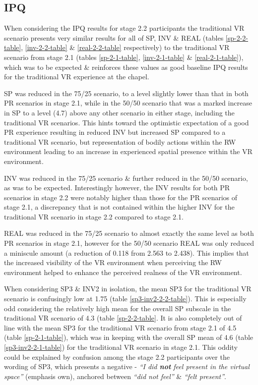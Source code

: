 
\subsection{IPQ}

When considering the IPQ results for stage 2.2 participants the traditional VR scenario presents very similar results for all of SP, INV \& REAL (tables \ref{sp-2-2-table}, \ref{inv-2-2-table} \& \ref{real-2-2-table} respectively) to the traditional VR scenario from stage 2.1 (tables \ref{sp-2-1-table}, \ref{inv-2-1-table} \& \ref{real-2-1-table}), which was to be expected \& reinforces these values as good baseline IPQ results for the traditional VR experience at the chapel.

SP was reduced in the 75/25 scenario, to a level slightly lower than that in both PR scenarios in stage 2.1, while in the 50/50 scenario that was a marked increase in SP to a level (4.7) above any other scenario in either stage, including the traditional VR scenarios. This hints toward the optimistic expectation of a good PR experience resulting in reduced INV but increased SP compared to a traditional VR scenario, but representation of bodily actions within the RW environment leading to an increase in experienced spatial presence within the VR environment.

INV was reduced in the 75/25 scenario \& further reduced in the 50/50 scenario, as was to be expected. Interestingly however, the INV results for both PR scenarios in stage 2.2 were notably higher than those for the PR scenarios of stage 2.1, a discrepancy that is not contained within the higher INV for the traditional VR scenario in stage 2.2 compared to stage 2.1.

REAL was reduced in the 75/25 scenario to almost exactly the same level as both PR scenarios in stage 2.1, however for the 50/50 scenario REAL was only reduced a miniscule amount (a reduction of 0.118 from 2.563 to 2.438). This implies that the increased visibility of the VR environment when perceiving the RW environment helped to enhance the perceived realness of the VR environment.

When considering SP3 \& INV2 in isolation, the mean SP3 for the traditional VR scenario is confusingly low at 1.75 (table \ref{sp3-inv2-2-2-table}). This is especially odd considering the relatively high mean for the overall SP subscale in the traditional VR scenario of 4.3 (table \ref{sp-2-2-table}. It is also completely out of line with the mean SP3 for the traditional VR scenario from stage 2.1 of 4.5 (table \ref{sp-2-1-table}), which was in keeping with the overall SP mean of 4.6 (table \ref{sp3-inv2-2-1-table}) for the traditional VR scenario in stage 2.1. This oddity could be explained by confusion among the stage 2.2 participants over the wording of SP3, which presents a negative - \textit{``I did \textbf{not} feel present in the virtual space''} (emphasis own), anchored between \textit{``did not feel''} \& \textit{``felt present''}.

